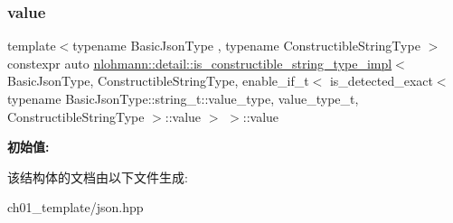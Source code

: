 \subsubsection{\texorpdfstring{value}{value}}
{\footnotesize\ttfamily template$<$typename Basic\+Json\+Type , typename Constructible\+String\+Type $>$ \\
constexpr auto \mbox{\hyperlink{structnlohmann_1_1detail_1_1is__constructible__string__type__impl}{nlohmann\+::detail\+::is\+\_\+constructible\+\_\+string\+\_\+type\+\_\+impl}}$<$ Basic\+Json\+Type, Constructible\+String\+Type, enable\+\_\+if\+\_\+t$<$ is\+\_\+detected\+\_\+exact$<$ typename Basic\+Json\+Type\+::string\+\_\+t\+::value\+\_\+type, value\+\_\+type\+\_\+t, Constructible\+String\+Type $>$\+::value $>$ $>$\+::value\hspace{0.3cm}{\ttfamily [static]}}

{\bfseries 初始值\+:}
\begin{DoxyCode}{0}
\DoxyCodeLine{=}

\end{DoxyCode}


该结构体的文档由以下文件生成\+:\begin{DoxyCompactItemize}
\item 
ch01\+\_\+template/json.\+hpp\end{DoxyCompactItemize}
